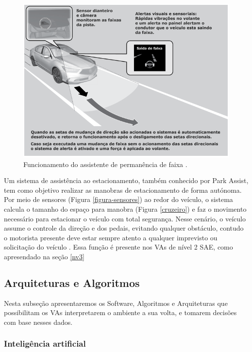 \begin{figure}[H]
\centering
\includegraphics[width=\textwidth]{Figures/assistente.png}
\caption{Funcionamento do assistente de permanência de faixa \cite{caio}.}
\label{assistente}
\end{figure}

 \label{estacionamento}


Um sistema de assistência ao estacionamento, também conhecido por Park Assist, tem como objetivo realizar as manobras de estacionamento de forma autónoma. Por meio de sensores (Figura \ref{figura-sensores}) ao redor do veículo, o sistema calcula o tamanho do espaço para manobra (Figura \ref{cruzeiro}) e faz o movimento necessário para estacionar o veículo com total segurança. Nesse cenário, o veículo assume o controle da direção e dos pedais, evitando qualquer obstáculo, contudo o motorista presente deve estar sempre atento a qualquer imprevisto ou solicitação do veículo \cite{caio}. Essa função é presente nos VAs de nível 2 SAE, como apresendado na seção \ref{nv3} 

\subsection{Arquiteturas e Algoritmos} \label{arq_alg}

Nesta subseção apresentaremos os Software, Algoritmos e Arquiteturas que possibilitam os VAs interpretarem o ambiente a sua volta, e tomarem decisões com base nesses dados. 


\subsubsection{Inteligência artificial} \label{ia}

